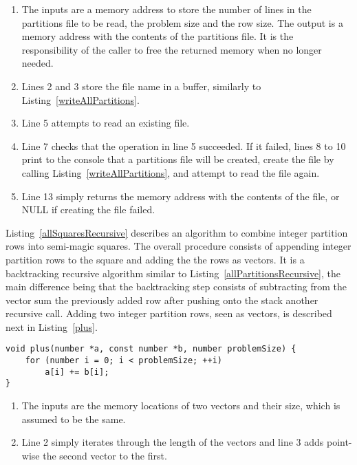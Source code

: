 \begin{enumerate}
\item The inputs are a memory address to store the number of lines in the partitions file to be read, the problem size and the row size. The output is a memory address with the contents of the partitions file. It is the responsibility of the caller to free the returned memory when no longer needed.
\item Lines 2 and 3 store the file name in a buffer, similarly to Listing~\ref{writeAllPartitions}.
\addtocounter{enumi}{2}
\item Line 5 attempts to read an existing file.
\addtocounter{enumi}{1}
\item Line 7 checks that the operation in line 5 succeeded. If it failed, lines 8 to 10 print to the console that a partitions file will be created, create the file by calling Listing~\ref{writeAllPartitions}, and attempt to read the file again.
\addtocounter{enumi}{5}
\item Line 13 simply returns the memory address with the contents of the file, or NULL if creating the file failed.
\end{enumerate}

Listing~\ref{allSquaresRecursive} describes an algorithm to combine integer partition rows into semi-magic squares. The overall procedure consists of appending integer partition rows to the square and adding the the rows as vectors. It is a backtracking recursive algorithm similar to Listing~\ref{allPartitionsRecursive}, the main difference being that the backtracking step consists of subtracting from the vector sum the previously added row after pushing onto the stack another recursive call. Adding two integer partition rows, seen as vectors, is described next in Listing~\ref{plus}.

\begin{lstlisting}[caption={Adding two vectors.},label={plus}]
void plus(number *a, const number *b, number problemSize) {
    for (number i = 0; i < problemSize; ++i)
        a[i] += b[i];
}
\end{lstlisting}

\begin{enumerate}
\item The inputs are the memory locations of two vectors and their size, which is assumed to be the same.
\item Line 2 simply iterates through the length of the vectors and line 3 adds point-wise the second vector to the first.
\end{enumerate}

